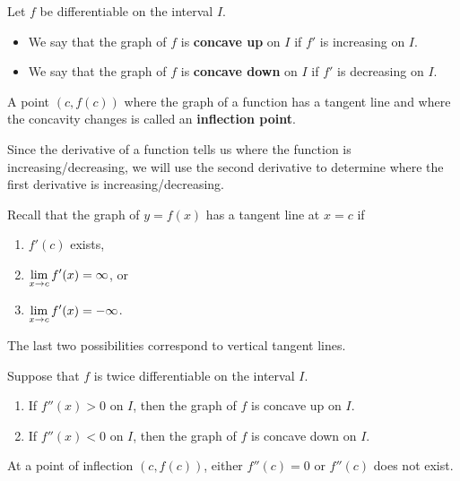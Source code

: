 \setcounter{chapter}{4}
\setcounter{section}{4}
\setcounter{theorem}{0}
\setcounter{equation}{0}


\begin{definition}
Let $f$ be differentiable on the interval $I$.
\begin{itemize}
\item We say that the graph of $f$ is \textbf{concave up} on $I$ if $f'$ is increasing on $I$.
\item We say that the graph of $f$ is \textbf{concave down} on $I$ if $f'$ is decreasing on $I$.
\end{itemize}
A point $(c,f(c))$ where the graph of a function has a tangent line and where the concavity changes is called an \textbf{inflection point}.
\end{definition}

\vfill

\begin{remark}
Since the derivative of a function tells us where the function is increasing/decreasing, we will use the second derivative to determine where the first derivative is increasing/decreasing.
\end{remark}

\vfill

\begin{remark}
Recall that the graph of $y=f(x)$ has a tangent line at $x=c$ if 
\begin{enumerate}
\item $f'(c)$ exists,
\item $\displaystyle\lim_{x\to c}f'(x) = \infty$, or
\item $\displaystyle\lim_{x\to c}f'(x) = -\infty$.
\end{enumerate}
The last two possibilities correspond to vertical tangent lines.
\end{remark}

\vfill

\newpage

\begin{theorem}
Suppose that $f$ is twice differentiable on the interval $I$.
\begin{enumerate}
\item If $f''(x)>0$ on $I$, then the graph of $f$ is concave up on $I$.
\item If $f''(x)<0$ on $I$, then the graph of $f$ is concave down on $I$.
\end{enumerate}
At a point of inflection $(c,f(c))$, either $f''(c)=0$ or $f''(c)$ does not exist.
\end{theorem}

